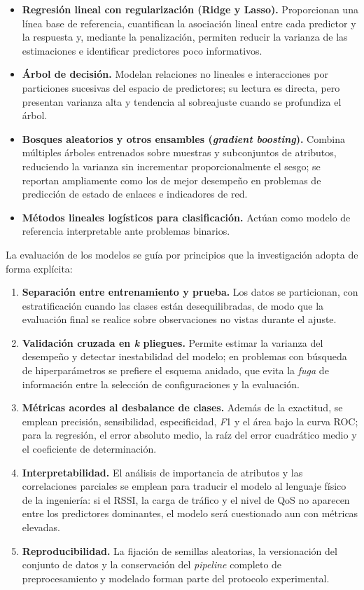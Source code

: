 \documentclass[
  12pt,
]{article}
\providecommand{\tightlist}{%
  \setlength{\itemsep}{0pt}\setlength{\parskip}{0pt}}
\begin{document}
\begin{itemize}
\tightlist
\item
  \textbf{Regresión lineal con regularización (Ridge y Lasso).}
  Proporcionan una línea base de referencia, cuantifican la asociación
  lineal entre cada predictor y la respuesta y, mediante la
  penalización, permiten reducir la varianza de las estimaciones e
  identificar predictores poco informativos.
\item
  \textbf{Árbol de decisión.} Modelan relaciones no lineales e
  interacciones por particiones sucesivas del espacio de predictores; su
  lectura es directa, pero presentan varianza alta y tendencia al
  sobreajuste cuando se profundiza el árbol.
\item
  \textbf{Bosques aleatorios y otros ensambles (\emph{gradient
  boosting}).} Combina múltiples árboles entrenados sobre muestras y
  subconjuntos de atributos, reduciendo la varianza sin incrementar
  proporcionalmente el sesgo; se reportan ampliamente como los de mejor
  desempeño en problemas de predicción de estado de enlaces e
  indicadores de red.
\item
  \textbf{Métodos lineales logísticos para clasificación.} Actúan como
  modelo de referencia interpretable ante problemas binarios.
\end{itemize}

La evaluación de los modelos se guía por principios que la investigación
adopta de forma explícita:

\begin{enumerate}
\def\labelenumi{\arabic{enumi}.}
\tightlist
\item
  \textbf{Separación entre entrenamiento y prueba.} Los datos se
  particionan, con estratificación cuando las clases están
  desequilibradas, de modo que la evaluación final se realice sobre
  observaciones no vistas durante el ajuste.
\item
  \textbf{Validación cruzada en \emph{k} pliegues.} Permite estimar la
  varianza del desempeño y detectar inestabilidad del modelo; en
  problemas con búsqueda de hiperparámetros se prefiere el esquema
  anidado, que evita la \emph{fuga} de información entre la selección de
  configuraciones y la evaluación.
\item
  \textbf{Métricas acordes al desbalance de clases.} Además de la
  exactitud, se emplean precisión, sensibilidad, especificidad,
  \emph{F}1 y el área bajo la curva ROC; para la regresión, el error
  absoluto medio, la raíz del error cuadrático medio y el coeficiente de
  determinación.
\item
  \textbf{Interpretabilidad.} El análisis de importancia de atributos y
  las correlaciones parciales se emplean para traducir el modelo al
  lenguaje físico de la ingeniería: si el RSSI, la carga de tráfico y el
  nivel de QoS no aparecen entre los predictores dominantes, el modelo
  será cuestionado aun con métricas elevadas.
\item
  \textbf{Reproducibilidad.} La fijación de semillas aleatorias, la
  versionación del conjunto de datos y la conservación del
  \emph{pipeline} completo de preprocesamiento y modelado forman parte
  del protocolo experimental.
\end{enumerate}
\end{document}

